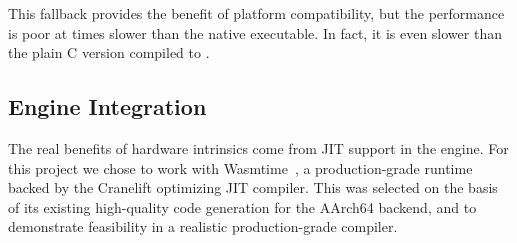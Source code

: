 This fallback provides the benefit of platform compatibility, but the
performance is poor at \MetricGenericWasmtimeBaselineDivNative times slower than
the native executable. In fact, it is even
\MetricGenericWasmtimeBaselineDivWasmtimeBaselineGeneric slower than the plain C
version compiled to \wasm.

\subsection{Engine Integration}
\label{sec:engine}

The real benefits of hardware intrinsics come from JIT support in the \wasm
engine. For this project we chose to work with Wasmtime~\cite{wasmtime}, a
production-grade \wasm runtime backed by the Cranelift optimizing JIT compiler.
This was selected on the basis of its existing high-quality code generation for
the AArch64 backend, and to demonstrate feasibility in a realistic
production-grade compiler.


